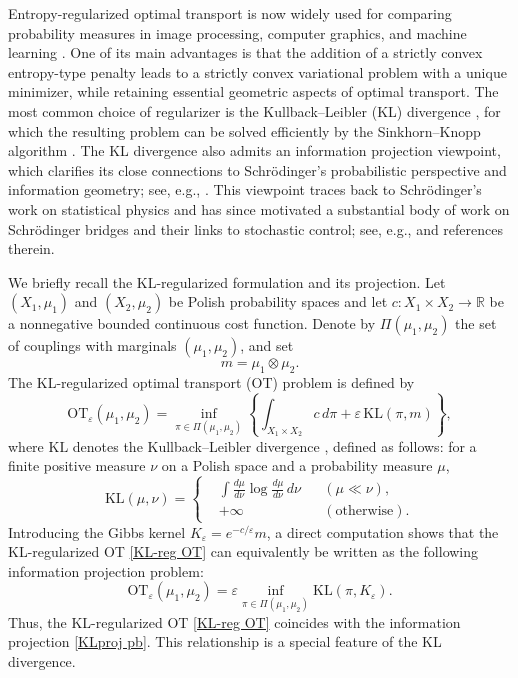 \documentclass[a4paper,11pt]{article}
\theoremstyle{plain}
\theoremstyle{definition}
\theoremstyle{remark}
\theoremstyle{plain}
\numberwithin{equation}{section}
\newcommand{\ep}{\varepsilon}
\newcommand{\1}{\mbox{1}\hspace{-0.25em}\mbox{l}} %
\begin{document}
Entropy-regularized optimal transport is now widely used for comparing probability measures in image processing, computer graphics, and machine learning \cite{cuturi2013sinkhorn, patrini2020sinkhorn, solomon2015convolutional}. One of its main advantages is that the addition of a strictly convex entropy-type penalty leads to a strictly convex variational problem with a unique minimizer, while retaining essential geometric aspects of optimal transport. The most common choice of regularizer is the Kullback--Leibler (KL) divergence \cite{KL51}, for which the resulting problem can be solved efficiently by the Sinkhorn--Knopp algorithm \cite{sinkhorn1964relationship, SK1967}. The KL divergence also admits an information projection viewpoint, which clarifies its close connections to Schr\"odinger's probabilistic perspective and information geometry; see, e.g., \cite{AmariNagaoka2000}. This viewpoint traces back to Schr\"odinger's work on statistical physics \cite{schrodinger1931} and has since motivated a substantial body of work on Schr\"odinger bridges and their links to stochastic control; see, e.g., \cite{chen2021stochastic, Leonard2014, Nutz2022introduction} and references therein.

We briefly recall the KL-regularized formulation and its projection. 
Let $(X_1,\mu_1)$ and $(X_2,\mu_2)$ be Polish probability spaces and let
$c:X_1\times X_2\to\mathbb{R}$ be a nonnegative bounded continuous cost
function. Denote by $\Pi(\mu_1,\mu_2)$ the set of couplings with marginals
$(\mu_1, \mu_2)$, and set 
\begin{equation*}
m = \mu_1 \otimes \mu_2.
\end{equation*}
The KL-regularized optimal transport (OT) problem is defined by 
\begin{equation}\label{KL-reg OT}
  \mathrm{OT}_\ep(\mu_1, \mu_2)
  = \inf_{\pi\in\Pi(\mu_1,\mu_2)}\left\{\int_{X_1 \times X_2} c\,d\pi + \ep\,\mathrm{KL}(\pi,m)\right\}, 
\end{equation}
where $\mathrm{KL}$ denotes the Kullback--Leibler divergence \cite{KL51}, defined as follows: for a finite positive measure $\nu$ on a Polish space and a probability measure $\mu$, 
\begin{equation*}
\mathrm{KL}(\mu, \nu) 
= \left\{
  \begin{aligned}
  &\int \frac{d\mu}{d\nu} \log{\frac{d\mu}{d\nu}}\, d\nu && (\mu\ll\nu), \\
  &+ \infty && (\mathrm{otherwise}).
  \end{aligned}
  \right. 
\end{equation*}
Introducing the Gibbs kernel $K_\ep = e^{-c/\ep} m$, a direct computation shows that the KL-regularized OT \eqref{KL-reg OT} can equivalently be written as the following information projection problem:
\begin{equation}\label{KLproj pb}
  \mathrm{OT}_\ep(\mu_1, \mu_2) = \ep\inf_{\pi\in\Pi(\mu_1,\mu_2)} \mathrm{KL}(\pi, K_\ep).
\end{equation}
Thus, the KL-regularized OT \eqref{KL-reg OT} coincides with the information projection \eqref{KLproj pb}. This relationship is a special feature of the KL divergence. 
\end{document}
